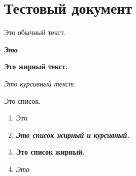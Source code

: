 \documentclass{article}%
\begin{document}
%
\normalsize%
\section{Тестовый документ}%
\begin{flushleft}%
Это обычный текст.%
\end{flushleft}%
\begin{flushleft}%
\textbf{\textit{Это}}%
\end{flushleft}%
\begin{flushleft}%
\textbf{Это жирный текст.}%
\end{flushleft}%
\begin{flushleft}%
\textit{Это курсивный текст.}%
\end{flushleft}%
\begin{flushleft}%
Это список.%
\end{flushleft}%
\begin{enumerate}%
\item Это %
\item \textbf{\textit{Это список жирный и курсивный.}}%
\item \textbf{Это список жирный.}%
\item \textit{Это}%
\end{enumerate}%
\end{document}
